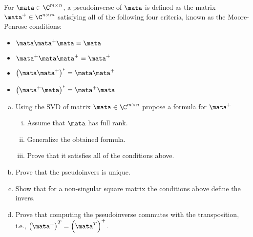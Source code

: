 \begin{Problem}
  For $\mata\in\C^{m\times n}$, a pseudoinverse of $\mata$ is
  defined as the matrix $\mata^+\in\C^{n\times m}$ satisfying all of
  the following four criteria, known as the Moore-Penrose conditions:
  \begin{itemize}
  \item $\mata\mata^+\mata = \mata$
  \item $\mata^+\mata\mata^+ = \mata^+$
  \item $\left(\mata\mata^+\right)^* = \mata\mata^+$
  \item $\left(\mata^+\mata\right)^* = \mata^+\mata$
  \end{itemize}
  \begin{enumerate}[(a)]
  \item Using the SVD of matrix $\mata\in\C^{m\times n}$ propose a
    formula for $\mata^+$
    \begin{enumerate}[i.]
    \item Assume that $\mata$ has full rank.
    \item Generalize the obtained formula.
    \item Prove that it satisfies all of the conditions above.
    \end{enumerate}
  \item Prove that the pseudoinvers is unique.
  \item Show that for a non-singular square matrix the conditions
    above define the invers.
  \item Prove that computing the pseudoinverse commutes with the
    transposition, i.e.,
    $\left(\mata^+\right)^T = \left(\mata^T\right)^+$.
  \end{enumerate}
\end{Problem}
